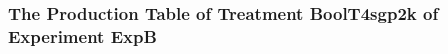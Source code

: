  \begin{frame}
 \fontsize{8pt}{9pt}\selectfont
 \frametitle{ The Production Table of Treatment BoolT4sgp2k of Experiment ExpB }

 \label{ExpBGrammarTable026.tex}  
 \end{frame}

